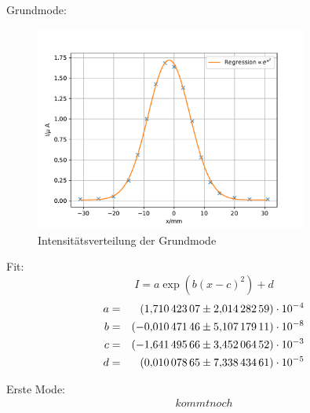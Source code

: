 Grundmode:
\begin{figure}
  \centering
  \includegraphics[width=0.8\textwidth]{grundmode.pdf}
  \caption{Intensitätsverteilung der Grundmode}
  \label{fig:grundmode}
\end{figure}
Fit:
\begin{equation*}
  I= a \exp{\left( b(x-c)^2 \right)}+d
\end{equation*}
\begin{align*}
a &=& \SI{ 1.71042307 \pm 2.01428259e-04}{}\\
b &=& \SI{-0.01047146 \pm 5.10717911e-08}{}\\
c &=& \SI{-1.64149566 \pm 3.45206452e-03}{}\\
d &=& \SI{ 0.01007865 \pm 7.33843461e-05}{}\\
\end{align*}
\FloatBarrier

Erste Mode:
\begin{align*}
kommt noch\\
\end{align*}
\FloatBarrier
